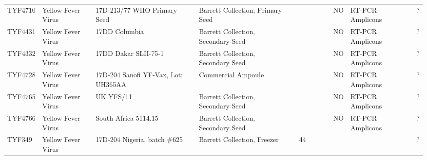 \begin{longtable}{@{}lllllllllllll@{}}
TYF4710        & Yellow Fever Virus & 17D-213/77 WHO Primary Seed               & Barrett Collection, Primary Seed       &             &                         &                       &           &          & NO                          & RT-PCR Amplicons   &                                                                                                  & ?                          \\
TYF4431        & Yellow Fever Virus & 17DD Columbia                             & Barrett Collection, Secondary Seed     &             &                         &                       &           &          & NO                          & RT-PCR Amplicons   &                                                                                                  & ?                          \\
TYF4332        & Yellow Fever Virus & 17DD Dakar SLII-75-1                      & Barrett Collection, Secondary Seed     &             &                         &                       &           &          & NO                          & RT-PCR Amplicons   &                                                                                                  & ?                          \\
TYF4728        & Yellow Fever Virus & 17D-204 Sanofi YF-Vax, Lot: UH365AA       & Commercial Ampoule                     &             &                         &                       &           &          & NO                          & RT-PCR Amplicons   &                                                                                                  & ?                          \\
TYF4765        & Yellow Fever Virus & UK YFS/11                                 & Barrett Collection, Secondary Seed     &             &                         &                       &           &          & NO                          & RT-PCR Amplicons   &                                                                                                  & ?                          \\
TYF4766        & Yellow Fever Virus & South Africa 5114.15                      & Barrett Collection, Secondary Seed     &             &                         &                       &           &          & NO                          & RT-PCR Amplicons   &                                                                                                  & ?                          \\
TYF349         & Yellow Fever Virus & 17D-204 Nigeria, batch \#625              & Barrett Collection, Freezer            &             & 44                      &                       &           &          &                             &                    &                                                                                                  & ?                          \\

\end{longtable}
